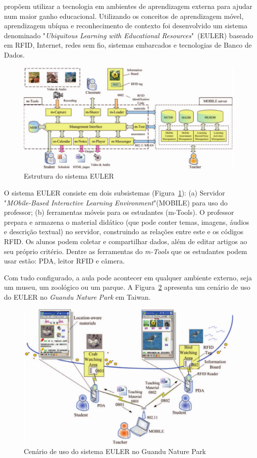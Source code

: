 \cite{Tan:2007} propõem utilizar a tecnologia em ambientes de aprendizagem externa para ajudar num maior ganho educacional. Utilizando os conceitos de aprendizagem móvel, aprendizagem ubíqua e reconhecimento de contexto foi desenvolvido um sistema denominado "\textit{Ubiquitous Learning with Educational Resources}"~(EULER) baseado em RFID, Internet, redes sem fio, sistemas embarcados e tecnologias de Banco de Dados.

\begin{figure}[ht]
	\centering
	\includegraphics[width=0.8\linewidth]{imgs/Tan2007a}
	\caption{Estrutura do sistema EULER}
	\label{fig:Tan2007a}
\end{figure}

O sistema EULER consiste em dois subsistemas (Figura~\ref{fig:Tan2007a}): (a) Servidor "\textit{MObile-Based Interactive Learning Environment}"(MOBILE) para uso do professor; (b) ferramentas móveis para os estudantes (m-Tools). O professor prepara e armazena o material didático (que pode conter temas, imagens, áudios e descrição textual) no servidor, construindo as relações entre este e os códigos RFID. Os alunos podem coletar e compartilhar dados, além de editar artigos ao seu próprio critério. Dentre as ferramentas do \textit{m-Tools} que os estudantes podem usar estão: PDA, leitor RFID e câmera.

Com tudo configurado, a aula pode acontecer em qualquer ambiente externo, seja um museu, um zoológico ou um parque. A Figura~\ref{fig:Tan2007b} apresenta um cenário de uso do EULER no \textit{Guandu Nature Park} em Taiwan.

\begin{figure}[ht]
	\centering
	\includegraphics[width=0.9\linewidth]{imgs/Tan2007b}
	\caption{Cenário de uso do sistema EULER no Guandu Nature Park}
	\label{fig:Tan2007b}
\end{figure}

